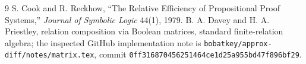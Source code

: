 \documentclass[11pt]{article}
\begin{document}
\begin{thebibliography}{9}
S. Cook and R. Reckhow, ``The Relative Efficiency of Propositional Proof
Systems,'' \emph{Journal of Symbolic Logic} 44(1), 1979.
B. A. Davey and H. A. Priestley, relation composition via Boolean matrices,
standard finite-relation algebra; the inspected GitHub implementation note is
\texttt{bobatkey/approx-diff/notes/matrix.tex}, commit
\texttt{0ff316870456251464ce1d25a955bd47f896bf29}.
\end{thebibliography}

\end{document}
